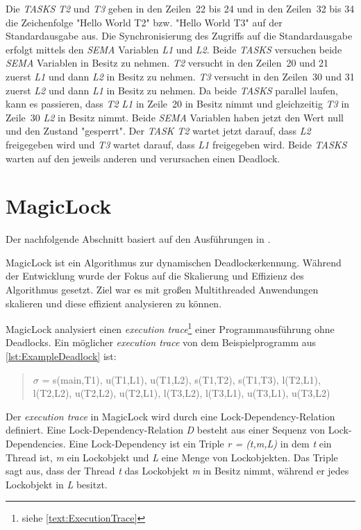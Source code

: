 Die \emph{TASKS} \emph{T2} und \emph{T3} geben in den Zeilen~22 bis 24 und in
den Zeilen~32 bis 34 die Zeichenfolge "Hello World T2" bzw. "Hello World T3" auf
der Standardausgabe aus. Die Synchronisierung des Zugriffs auf die
Standardausgabe erfolgt mittels den \emph{SEMA} Variablen \emph{L1} und
\emph{L2}. Beide \emph{TASKS} versuchen beide \emph{SEMA} Variablen in Besitz zu
nehmen. \emph{T2} versucht in den Zeilen~20 und 21 zuerst \emph{L1} und dann
\emph{L2} in Besitz zu nehmen. \emph{T3} versucht in den Zeilen~30 und 31 zuerst
\emph{L2} und dann \emph{L1} in Besitz zu nehmen. Da beide \emph{TASKS} parallel
laufen, kann es passieren, dass \emph{T2} \emph{L1} in Zeile~20 in Besitz nimmt
und gleichzeitig \emph{T3} in Zeile~30 \emph{L2} in Besitz nimmt. Beide
\emph{SEMA} Variablen haben jetzt den Wert null und den Zustand "gesperrt". Der
\emph{TASK} \emph{T2} wartet jetzt darauf, dass \emph{L2} freigegeben wird und
\emph{T3} wartet darauf, dass \emph{L1} freigegeben wird. Beide \emph{TASKS}
warten auf den jeweils anderen und verursachen einen Deadlock.

\section{MagicLock}
\label{section:MagicLock}
Der nachfolgende Abschnitt basiert auf den Ausführungen in \autocite{MagicLock}.

MagicLock ist ein Algorithmus zur dynamischen Deadlockerkennung. Während der
Entwicklung wurde der Fokus auf die Skalierung und Effizienz des Algorithmus
gesetzt. Ziel war es mit großen Multithreaded Anwendungen skalieren und diese
effizient analysieren zu können.

MagicLock analysiert einen \emph{execution trace}\footnote{siehe
\cref{text:ExecutionTrace}} einer Programmausführung ohne Deadlocks. Ein
möglicher \emph{execution trace} von dem Beispielprogramm aus
\cref{lst:ExampleDeadlock} ist:
\begin{quote}
  \textbf{$\sigma$} = s(main,T1), u(T1,L1), u(T1,L2), s(T1,T2), s(T1,T3),
  l(T2,L1), l(T2,L2), u(T2,L2), u(T2,L1), l(T3,L2), l(T3,L1), u(T3,L1), u(T3,L2)
\end{quote}
Der \emph{execution trace} in MagicLock wird durch eine Lock-Dependency-Relation
definiert. Eine Lock-Dependency-Relation \emph{D} besteht aus einer Sequenz von
Lock-Dependencies. Eine Lock-Dependency ist ein Triple \emph{r = (t,m,L)} in dem
\emph{t} ein Thread ist, \emph{m} ein Lockobjekt und \emph{L} eine Menge von
Lockobjekten. Das Triple sagt aus, dass der Thread \emph{t} das Lockobjekt
\emph{m} in Besitz nimmt, während er jedes Lockobjekt in \emph{L} besitzt.

